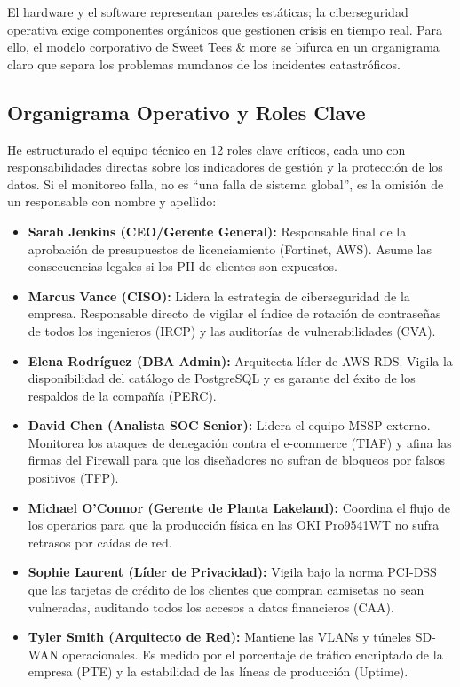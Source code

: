\documentclass[11pt,a4paper]{article}
\begin{document}
El hardware y el software representan paredes estáticas; la ciberseguridad operativa exige componentes orgánicos que gestionen crisis en tiempo real. Para ello, el modelo corporativo de Sweet Tees \& more se bifurca en un organigrama claro que separa los problemas mundanos de los incidentes catastróficos.

\subsection{Organigrama Operativo y Roles Clave}
He estructurado el equipo técnico en 12 roles clave críticos, cada uno con responsabilidades directas sobre los indicadores de gestión y la protección de los datos. Si el monitoreo falla, no es \enquote{una falla de sistema global}, es la omisión de un responsable con nombre y apellido:
\begin{itemize}
    \item \textbf{Sarah Jenkins (CEO/Gerente General):} Responsable final de la aprobación de presupuestos de licenciamiento (Fortinet, AWS). Asume las consecuencias legales si los PII de clientes son expuestos.
    \item \textbf{Marcus Vance (CISO):} Lidera la estrategia de ciberseguridad de la empresa. Responsable directo de vigilar el índice de rotación de contraseñas de todos los ingenieros (IRCP) y las auditorías de vulnerabilidades (CVA).
    \item \textbf{Elena Rodríguez (DBA Admin):} Arquitecta líder de AWS RDS. Vigila la disponibilidad del catálogo de PostgreSQL y es garante del éxito de los respaldos de la compañía (PERC).
    \item \textbf{David Chen (Analista SOC Senior):} Lidera el equipo MSSP externo. Monitorea los ataques de denegación contra el e-commerce (TIAF) y afina las firmas del Firewall para que los diseñadores no sufran de bloqueos por falsos positivos (TFP).
    \item \textbf{Michael O'Connor (Gerente de Planta Lakeland):} Coordina el flujo de los operarios para que la producción física en las OKI Pro9541WT no sufra retrasos por caídas de red.
    \item \textbf{Sophie Laurent (Líder de Privacidad):} Vigila bajo la norma PCI-DSS que las tarjetas de crédito de los clientes que compran camisetas no sean vulneradas, auditando todos los accesos a datos financieros (CAA).
    \item \textbf{Tyler Smith (Arquitecto de Red):} Mantiene las VLANs y túneles SD-WAN operacionales. Es medido por el porcentaje de tráfico encriptado de la empresa (PTE) y la estabilidad de las líneas de producción (Uptime).

\end{itemize}
\end{document}
